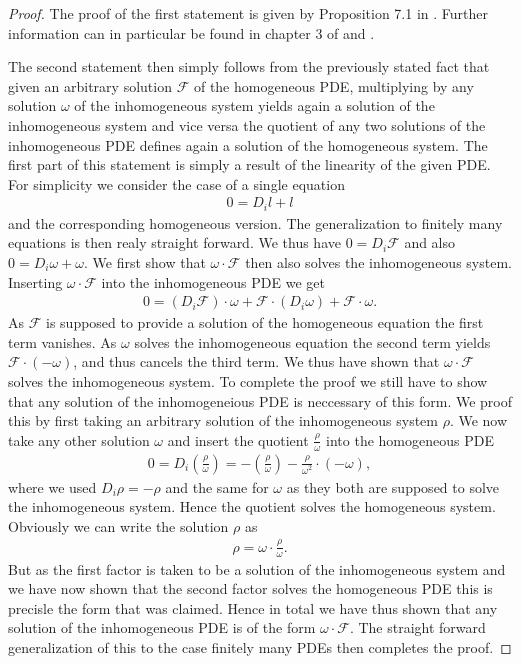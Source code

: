 \documentclass[a4paper,12pt, DIV=14, BCOR=5mm, twoside, headsepline]{scrbook}
\begin{document}
\begin{proof}
The proof of the first statement is given by Proposition 7.1 in \cite{seiler1994analysis}. Further information can in particular be found in chapter 3 of \cite{seiler2009involution} and \cite{articleCH}. 

The second statement then simply follows from the previously stated fact that given an arbitrary solution $\mathcal{F}$ of the homogeneous PDE, multiplying by any solution $\omega$ of the inhomogeneous system yields again a solution of the inhomogeneous system and vice versa the quotient of any two solutions of the inhomogeneous PDE defines again a solution of the homogeneous system. The first part of this statement is simply a result of the linearity of the given PDE. For simplicity we consider the case of a single equation 
\begin{align}
    0=D_i l + l 
\end{align}
and the corresponding homogeneous version. The generalization to finitely many equations is then realy straight forward. 
We thus have $0 = D_i \mathcal{F}$ and also $0 = D_i \omega + \omega$.
We first show that $\omega \cdot \mathcal{F}$ then also solves the inhomogeneous system. Inserting $\omega \cdot \mathcal{F}$ into the inhomogeneous PDE we get 
\begin{align}
    0 = \left ( D_i \mathcal{F} \right ) \cdot \omega + \mathcal{F} \cdot \left ( D_i \omega \right) + \mathcal{F} \cdot \omega. 
\end{align}
As $\mathcal{F}$ is supposed to provide a solution of the homogeneous equation the first term vanishes. As $\omega$ solves the inhomogeneous equation the second term yields $\mathcal{F} \cdot \left ( - \omega \right )$,
and thus cancels the third term. We thus have shown that $\omega \cdot \mathcal{F}$ solves the inhomogeneous system. To complete the proof we still have to show that any solution of the inhomogeneious PDE is neccessary of this form. We proof this by first taking an arbitrary solution of the inhomogeneous system $\rho$. We now take any other solution $\omega$ and insert the quotient $\frac{\rho}{\omega}$ into the homogeneous PDE
\begin{align}
    0 = D_i \left (\frac{\rho}{\omega} \right) = - (\frac{\rho}{\omega}) - \frac{\rho}{\omega^2} \cdot (-\omega) ,
\end{align}
where we used $D_i \rho = -\rho$ and the same for $\omega$ as they both are supposed to solve the inhomogeneous system. Hence the quotient solves the homogeneous system. Obviously we can write the solution $\rho$ as 
\begin{align}
    \rho = \omega \cdot  \frac{\rho}{\omega}.
\end{align}
But as the first factor is taken to be a solution of the inhomogeneous system and we have now shown that the second factor solves the homogeneous PDE this is precisle the form that was claimed. 
Hence in total we have thus shown that any solution of the inhomogeneous PDE is of the form $\omega \cdot \mathcal{F}$.
The straight forward generalization of this to the case finitely many PDEs then completes the proof.
\end{proof}
\end{document}
